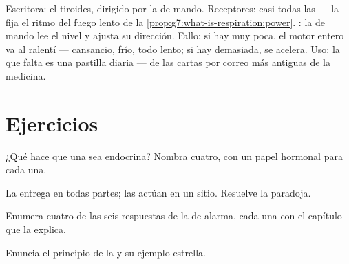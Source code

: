 \begin{example}\label{ex:g8:hormonal-communication:thyroid}
Escritora: el tiroides, dirigido por la  de mando. Receptores:
casi todas las  --- la  fija el ritmo del fuego lento de
la \cref{prop:g7:what-is-respiration:power}. : la
 de mando lee el nivel y ajusta su dirección. Fallo: si hay muy
poca, el motor entero va al ralentí --- cansancio, frío, todo lento; si
hay demasiada, se acelera. Uso: la  que falta es una pastilla
diaria --- de las cartas por correo más antiguas de la medicina.
\end{example}

\section{Ejercicios}

\begin{exercise}[$\star$]\label{exo:g8:hormonal-communication:1}
¿Qué hace que una  sea endocrina? Nombra cuatro, con un papel
hormonal para cada una.
\end{exercise}

\begin{exercise}[$\star$]\label{exo:g8:hormonal-communication:2}
La  entrega en todas partes; las  actúan en un sitio.
Resuelve la paradoja.
\end{exercise}

\begin{exercise}[$\star$]\label{exo:g8:hormonal-communication:3}
Enumera cuatro de las seis respuestas de la  de alarma, cada una
con el capítulo que la explica.
\end{exercise}

\begin{exercise}[$\star$]\label{exo:g8:hormonal-communication:4}
Enuncia el principio de la  y su ejemplo estrella.
\end{exercise}

